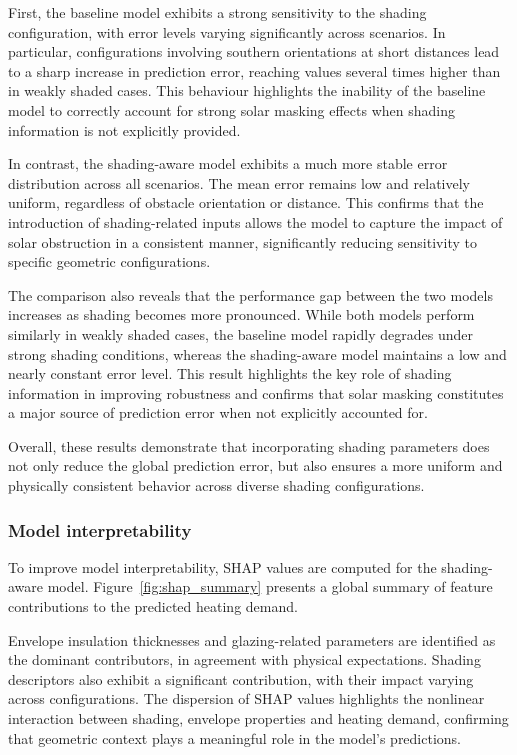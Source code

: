 \documentclass{article}
\begin{document}
First, the baseline model
exhibits a strong sensitivity to the shading configuration, with error levels
varying significantly across scenarios. In particular, configurations involving
southern orientations at short distances lead to a sharp increase in prediction
error, reaching values several times higher than in weakly shaded cases. This
behaviour highlights the inability of the baseline model to correctly account
for strong solar masking effects when shading information is not explicitly
provided.

In contrast, the shading-aware model exhibits a much more stable error
distribution across all scenarios. The mean error remains low and relatively
uniform, regardless of obstacle orientation or distance. This confirms that the
introduction of shading-related inputs allows the model to capture the impact of
solar obstruction in a consistent manner, significantly reducing sensitivity to
specific geometric configurations.

The comparison also reveals that the performance gap between the two models
increases as shading becomes more pronounced. While both models perform
similarly in weakly shaded cases, the baseline model rapidly degrades under
strong shading conditions, whereas the shading-aware model maintains a low and
nearly constant error level. This result highlights the key role of shading
information in improving robustness and confirms that solar masking constitutes
a major source of prediction error when not explicitly accounted for.

Overall, these results demonstrate that incorporating shading parameters does
not only reduce the global prediction error, but also ensures a more uniform and
physically consistent behavior across diverse shading configurations.


\subsubsection{Model interpretability}

To improve model interpretability, SHAP values are computed for the
shading-aware model. Figure~\ref{fig:shap_summary} presents a global summary of
feature contributions to the predicted heating demand.

Envelope insulation thicknesses and glazing-related parameters are identified as
the dominant contributors, in agreement with physical expectations. Shading
descriptors also exhibit a significant contribution, with their impact varying
across configurations. The dispersion of SHAP values highlights the nonlinear
interaction between shading, envelope properties and heating demand, confirming
that geometric context plays a meaningful role in the model’s predictions.
\end{document}
